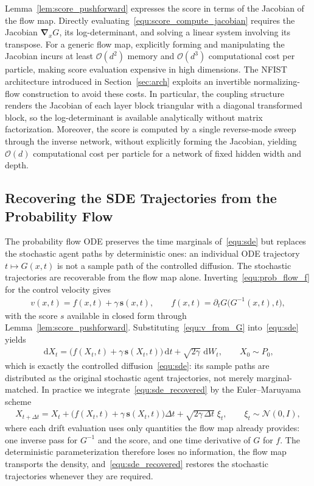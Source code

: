\documentclass[preprint]{elsarticle}
\newcommand{\dd}{\,\mathrm{d}}          %
\newcommand{\qb}[1]{\bigl(#1\bigr)}          %
\newcommand{\g}{\gamma}
\newcommand{\sN}{\mathcal{N}}
\newcommand{\inv}{^{-1}}
\begin{document}
Lemma~\ref{lem:score_pushforward} expresses the score in terms of the Jacobian of the flow map. Directly evaluating~\eqref{equ:score_compute_jacobian} requires the Jacobian $\boldsymbol{\nabla}_x G$, its log-determinant, and solving a linear system involving its transpose. For a generic flow map, explicitly forming and manipulating the Jacobian incurs at least $\mathcal{O}(d^2)$ memory and $\mathcal{O}(d^3)$ computational cost per particle, making score evaluation expensive in high dimensions. The NFIST architecture introduced in Section~\ref{sec:arch} exploits an invertible normalizing-flow construction to avoid these costs. In particular, the coupling structure renders the Jacobian of each layer block triangular with a diagonal transformed block, so the log-determinant is available analytically without matrix factorization. Moreover, the score is computed by a single reverse-mode sweep through the inverse network, without explicitly forming the Jacobian, yielding $\mathcal{O}(d)$ computational cost per particle for a network of fixed hidden width and depth.

\subsection{Recovering the SDE Trajectories from the Probability Flow}\label{sec:sde_recovery}
The probability flow ODE preserves the time marginals of~\eqref{equ:sde} but replaces the stochastic agent paths by deterministic ones: an individual ODE trajectory $t\mapsto G(x,t)$ is not a sample path of the controlled diffusion. The stochastic trajectories are recoverable from the flow map alone. Inverting~\eqref{equ:prob_flow_f} for the control velocity gives
\begin{align}
    v(x,t) = f(x,t) + \g\, \mathbf{s}(x,t),
    \qquad
    f(x,t) = \partial_t G\qb{G\inv(x,t),t},
    \label{equ:v_from_G}
\end{align}
with the score $s$ available in closed form through Lemma~\ref{lem:score_pushforward}. Substituting~\eqref{equ:v_from_G} into~\eqref{equ:sde} yields
\begin{align}
    \dd X_t = \qb{f(X_t,t) + \g\, \mathbf{s}(X_t,t)}\dd t + \sqrt{2\g}\,\dd W_t,
    \qquad X_0\sim P_0,
    \label{equ:sde_recovered}
\end{align}
which is exactly the controlled diffusion~\eqref{equ:sde}: its sample paths are distributed as the original stochastic agent trajectories, not merely marginal-matched. In practice we integrate~\eqref{equ:sde_recovered} by the Euler--Maruyama scheme
\begin{align*}
    X_{t+\Delta t} = X_t + \qb{f(X_t,t)+\g\, \mathbf{s}(X_t,t)}\Delta t + \sqrt{2\g\,\Delta t}\;\xi_t,
    \qquad \xi_t\sim\sN(0,I),
\end{align*}
where each drift evaluation uses only quantities the flow map already provides: one inverse pass for $G\inv$ and the score, and one time derivative of $G$ for $f$. The deterministic parameterization therefore loses no information, the flow map transports the density, and~\eqref{equ:sde_recovered} restores the stochastic trajectories whenever they are required.
\end{document}
